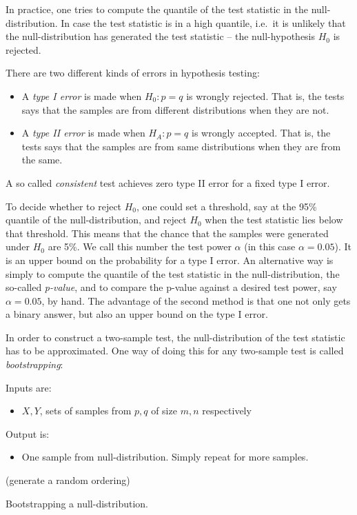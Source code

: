 In practice, one tries to compute the quantile of the test statistic in the null-distribution. In case the test statistic is in a high quantile, i.e.\ it is unlikely that the null-distribution has generated the test statistic -- the null-hypothesis $H_0$ is rejected.

There are two different kinds of errors in hypothesis testing:
\begin{itemize}
\item A \emph{type I error} is made when $H_0: p=q$ is wrongly rejected. That is, the tests says that the samples are from different distributions when they are not.
\item A \emph{type II error} is made when $H_A: p=q$ is wrongly accepted. That is, the tests says that the samples are from same distributions when they are from the same.
\end{itemize}
A so called \emph{consistent} test achieves zero type II error for a fixed type I error.

To decide whether to reject $H_0$, one could set a threshold, say at the 95\% quantile of the null-distribution, and reject $H_0$ when the test statistic lies below that threshold. This means that the chance that the samples were generated under $H_0$ are 5\%. We call this number the test power $\alpha$ (in this case $\alpha=0.05$). It is an upper bound on the probability for a type I error. An alternative way is simply to compute the quantile of the test statistic in the null-distribution, the so-called \emph{p-value}, and to compare the p-value against a desired test power, say $\alpha=0.05$, by hand. The advantage of the second method is that one not only gets a binary answer, but also an upper bound on the type I error.

In order to construct a two-sample test, the null-distribution of the test statistic has to be approximated. One way of doing this for any two-sample test is called \emph{bootstrapping}:
\begin{algorithm}
Inputs are:
\begin{itemize}
 \item $X,Y$, sets of samples from $p,q$ of size $m,n$ respectively
\end{itemize}
Output is:
\begin{itemize}
 \item One sample from null-distribution. Simply repeat for more samples.
\end{itemize}

 \begin{algorithmic}[1]
 \qquad (generate a random ordering)
\end{algorithmic}
\caption{Bootstrapping a null-distribution.}
\label{alg:bootstrapping}
\end{algorithm}

